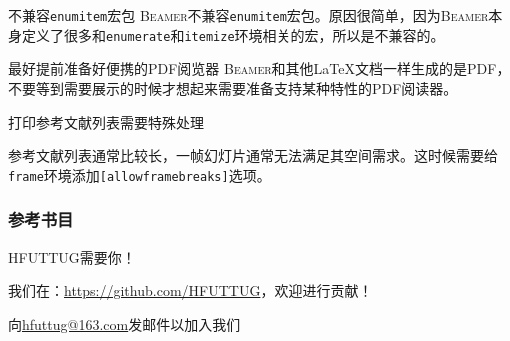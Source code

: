 \documentclass[aspectratio=169]{beamer}
\newcommand{\Beamer}{\textsc{Beamer}}
\newcommand{\enableindent}{\setlength{\parskip}{6pt}\setlength{\parindent}{2em}}
\begin{document}
\begin{frame}{不兼容\texttt{enumitem}宏包}
	\enableindent
	\Beamer 不兼容\texttt{enumitem}宏包。原因很简单，因为\Beamer 本身定义了很多和\texttt{enumerate}和\texttt{itemize}环境相关的宏，所以是不兼容的。
\end{frame}

\begin{frame}{最好提前准备好便携的PDF阅览器}
	\enableindent
	\Beamer 和其他\LaTeX 文档一样生成的是PDF，不要等到需要展示的时候才想起来需要准备支持某种特性的PDF阅读器。
\end{frame}

\begin{frame}{打印参考文献列表需要特殊处理}
	
	参考文献列表通常比较长，一帧幻灯片通常无法满足其空间需求。这时候需要给\texttt{frame}环境添加\texttt{[allowframebreaks]}选项。
\end{frame}

\begin{frame}[allowframebreaks]
\frametitle{参考书目}
{
	\tiny
	\nocite{*}
	\printbibliography[heading=none]
}
\end{frame}

\begin{frame}{HFUTTUG需要你！}
	\centering

	我们在：\url{https://github.com/HFUTTUG}，欢迎进行贡献！

	向\href{mailto:hfuttug@163.com}{hfuttug@163.com}发邮件以加入我们
\end{frame}
\end{document}
